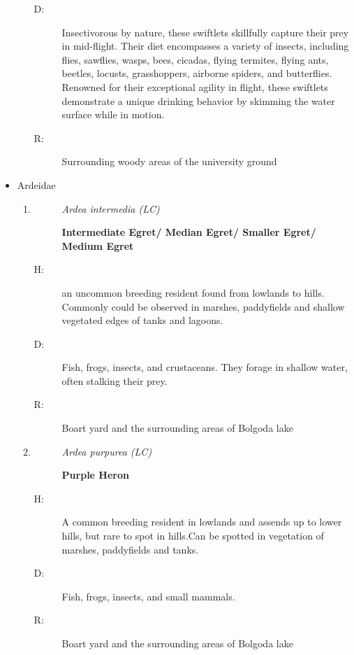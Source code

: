 \begin{itemize}
\begin{enumerate}
\begin{description}
\item[D: ]%
Insectivorous by nature, these swiftlets skillfully capture their prey in mid{-}flight. Their diet encompasses a variety of insects, including flies, sawflies, wasps, bees, cicadas, flying termites, flying ants, beetles, locusts, grasshoppers, airborne spiders, and butterflies. Renowned for their exceptional agility in flight, these swiftlets demonstrate a unique drinking behavior by skimming the water surface while in motion.%
\item[R: ]%
Surrounding woody areas of the university ground%
\end{description}%
\end{enumerate}%
\item%
Ardeidae%
\begin{enumerate}%
\item%
\begin{description}%
\item[]%
\textit{Ardea intermedia (LC)}%
\item[]%
\textbf{Intermediate Egret/ Median Egret/ Smaller Egret/ Medium Egret}%
\end{description}%
\begin{description}%
\item[H: ]%
an uncommon breeding resident found from lowlands to hills. Commonly could be observed in marshes, paddyfields and shallow vegetated edges of tanks and lagoons.%
\item[D: ]%
Fish, frogs, insects, and crustaceans. They forage in shallow water, often stalking their prey.%
\item[R: ]%
Boart yard and the surrounding areas of Bolgoda lake%
\end{description}%
\item%
\begin{description}%
\item[]%
\textit{Ardea purpurea (LC)}%
\item[]%
\textbf{Purple Heron}%
\end{description}%
\begin{description}%
\item[H: ]%
A common breeding resident in lowlands and assends up to lower hills, but rare to spot in hills.Can be spotted in vegetation of marshes, paddyfields and tanks. %
\item[D: ]%
Fish, frogs, insects, and small mammals.%
\item[R: ]%
Boart yard and the surrounding areas of Bolgoda lake%
\end{description}%

\end{enumerate}
\end{itemize}
